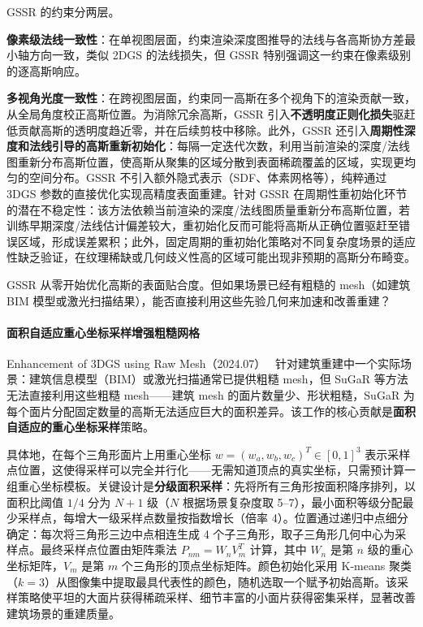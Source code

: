 GSSR 的约束分两层。

\textbf{像素级法线一致性}：在单视图层面，约束渲染深度图推导的法线与各高斯协方差最小轴方向一致，类似 2DGS 的法线损失，但 GSSR 特别强调这一约束在像素级别的逐高斯响应。

\textbf{多视角光度一致性}：在跨视图层面，约束同一高斯在多个视角下的渲染贡献一致，从全局角度校正高斯位置。为消除冗余高斯，GSSR 引入\textbf{不透明度正则化损失}驱赶低贡献高斯的透明度趋近零，并在后续剪枝中移除。此外，GSSR 还引入\textbf{周期性深度和法线引导的高斯重新初始化}：每隔一定迭代次数，利用当前渲染的深度/法线图重新分布高斯位置，使高斯从聚集的区域分散到表面稀疏覆盖的区域，实现更均匀的空间分布。GSSR 不引入额外隐式表示（SDF、体素网格等），纯粹通过 3DGS 参数的直接优化实现高精度表面重建。针对 GSSR 在周期性重初始化环节的潜在不稳定性：该方法依赖当前渲染的深度/法线图质量重新分布高斯位置，若训练早期深度/法线估计偏差较大，重初始化反而可能将高斯从正确位置驱赶至错误区域，形成误差累积；此外，固定周期的重初始化策略对不同复杂度场景的适应性缺乏验证，在纹理稀缺或几何歧义性高的区域可能出现非预期的高斯分布畸变。

GSSR 从零开始优化高斯的表面贴合度。但如果场景已经有粗糙的 mesh（如建筑 BIM 模型或激光扫描结果），能否直接利用这些先验几何来加速和改善重建？

\paragraph{面积自适应重心坐标采样增强粗糙网格}

Enhancement of 3DGS using Raw Mesh（2024.07）~\cite{2407_15435} 针对建筑重建中一个实际场景：建筑信息模型（BIM）或激光扫描通常已提供粗糙 mesh，但 SuGaR 等方法无法直接利用这些粗糙 mesh——建筑 mesh 的面片数量少、形状粗糙，SuGaR 为每个面片分配固定数量的高斯无法适应巨大的面积差异。该工作的核心贡献是\textbf{面积自适应的重心坐标采样}策略。

具体地，在每个三角形面片上用重心坐标 $w = (w_a, w_b, w_c)^T \in [0,1]^3$ 表示采样点位置，这使得采样可以完全并行化——无需知道顶点的真实坐标，只需预计算一组重心坐标模板。关键设计是\textbf{分级面积采样}：先将所有三角形按面积降序排列，以面积比阈值 $1/4$ 分为 $N+1$ 级（$N$ 根据场景复杂度取 5--7），最小面积等级分配最少采样点，每增大一级采样点数量按指数增长（倍率 4）。位置通过递归中点细分确定：每次将三角形三边中点相连生成 4 个子三角形，取子三角形几何中心为采样点。最终采样点位置由矩阵乘法 $P_{nm} = W_n V_m^T$ 计算，其中 $W_n$ 是第 $n$ 级的重心坐标矩阵，$V_m$ 是第 $m$ 个三角形的顶点坐标矩阵。颜色初始化采用 K-means 聚类（$k=3$）从图像集中提取最具代表性的颜色，随机选取一个赋予初始高斯。该采样策略使平坦的大面片获得稀疏采样、细节丰富的小面片获得密集采样，显著改善建筑场景的重建质量。


